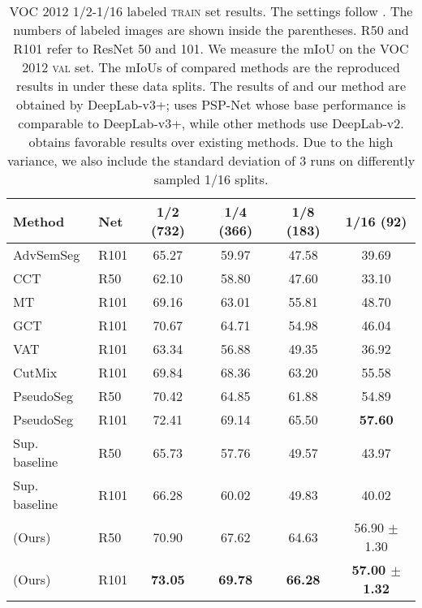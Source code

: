 \begin{table}[tb]
    \small
    \centering
    \caption{VOC 2012 1/2-1/16 labeled \textsc{train} set results. The settings follow \cite{zou2020pseudoseg}. The numbers of labeled images are shown inside the parentheses. R50 and R101 refer to ResNet 50 and 101. We measure the mIoU on the VOC 2012 \textsc{val} set. The mIoUs of compared methods are the reproduced results in \cite{zou2020pseudoseg} under these data splits. The results of \cite{zou2020pseudoseg,french2020semi} and our method are obtained by DeepLab-v3+; \cite{ouali2020semi} uses PSP-Net whose base performance is comparable to DeepLab-v3+, while other methods use DeepLab-v2. \ours{} obtains favorable results over existing methods. Due to the high variance, we also include the standard deviation of 3 runs on differently sampled 1/16 splits.} 
    \label{tab:voc1}
    \setlength{\tabcolsep}{0.9pt}
    \begin{tabular}{llcccc}
    \toprule
        Method    & Net & 1/2 (732) & 1/4 (366) & 1/8 (183) & 1/16 (92) \\
    \midrule
        AdvSemSeg \cite{hung2019adversarial}  & R101  & 65.27  & 59.97  & 47.58  & 39.69 \\
        CCT \cite{ouali2020semi}  & R50  & 62.10  & 58.80  & 47.60  & 33.10 \\
        MT \cite{tarvainen2017mean}  & R101  & 69.16  & 63.01  & 55.81  & 48.70 \\
        GCT \cite{ke2020guided}  & R101  & 70.67  & 64.71  & 54.98  & 46.04  \\
        VAT \cite{miyato2018virtual}  & R101  & 63.34  & 56.88  & 49.35  & 36.92  \\
        CutMix \cite{french2020semi}  & R101  & 69.84  & 68.36  & 63.20  & 55.58  \\
        PseudoSeg \cite{zou2020pseudoseg} & R50  & 70.42  & 64.85  & 61.88  & 54.89  \\
        PseudoSeg \cite{zou2020pseudoseg} & R101 & 72.41  & 69.14  & 65.50  & \textbf{57.60}  \\
    \midrule
        Sup. baseline  & R50  & 65.73  & 57.76  & 49.57  & 43.97 \\
        Sup. baseline  & R101 & 66.28  & 60.02  & 49.83  & 40.02 \\
        \ours{} (Ours) & R50  & 70.90  & 67.62  & 64.63  & 56.90 $\pm$1.30 \\
        \ours{} (Ours) & R101 & \textbf{73.05}  & \textbf{69.78}  & \textbf{66.28}  & \textbf{57.00 $\pm$1.32} \\
    \bottomrule
    \end{tabular}
\end{table}

